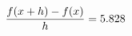 \documentclass[preview]{standalone}
\begin{document}
\begin{align*}
\special{dvisvgm:raw <g id='unique000'>}\frac{f(x+h)-f(x)}{h} = 5.828\special{dvisvgm:raw </g>}
\end{align*}
\end{document}

